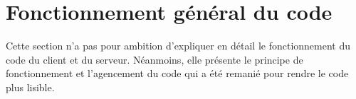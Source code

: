 \section{Fonctionnement général du code}

Cette section n'a pas pour ambition d'expliquer en détail le fonctionnement du
code du client et du serveur. Néanmoins, elle présente le principe de
fonctionnement et l'agencement du code qui a été remanié pour rendre le code
plus lisible.




